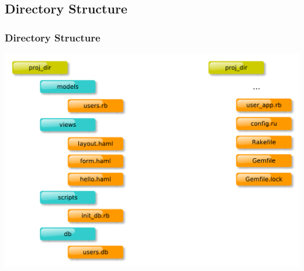 \documentclass{beamer}
\begin{document}
\subsection{Directory Structure}
\begin{frame}[fragile]\frametitle{Directory Structure}

  \begin{center}
    \includegraphics[scale=0.5]{diagrams/dir_structure.pdf}  
  \end{center}
  
\end{frame}
\end{document}
